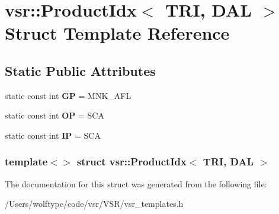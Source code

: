 \hypertarget{structvsr_1_1_product_idx_3_01_t_r_i_00_01_d_a_l_01_4}{\section{vsr\-:\-:Product\-Idx$<$ T\-R\-I, D\-A\-L $>$ Struct Template Reference}
\label{structvsr_1_1_product_idx_3_01_t_r_i_00_01_d_a_l_01_4}
}
\subsection*{Static Public Attributes}
\begin{DoxyCompactItemize}
\item 
\hypertarget{structvsr_1_1_product_idx_3_01_t_r_i_00_01_d_a_l_01_4_a21e13dab2133986b6debaa185715ffb8}{static const int {\bfseries G\-P} = M\-N\-K\-\_\-\-A\-F\-L}\label{structvsr_1_1_product_idx_3_01_t_r_i_00_01_d_a_l_01_4_a21e13dab2133986b6debaa185715ffb8}

\item 
\hypertarget{structvsr_1_1_product_idx_3_01_t_r_i_00_01_d_a_l_01_4_a2c413ceaba5c076a93ec4c3c874f64e0}{static const int {\bfseries O\-P} = S\-C\-A}\label{structvsr_1_1_product_idx_3_01_t_r_i_00_01_d_a_l_01_4_a2c413ceaba5c076a93ec4c3c874f64e0}

\item 
\hypertarget{structvsr_1_1_product_idx_3_01_t_r_i_00_01_d_a_l_01_4_af7522b476ae9495da0a429c1e62de389}{static const int {\bfseries I\-P} = S\-C\-A}\label{structvsr_1_1_product_idx_3_01_t_r_i_00_01_d_a_l_01_4_af7522b476ae9495da0a429c1e62de389}

\end{DoxyCompactItemize}
\subsubsection*{template$<$$>$ struct vsr\-::\-Product\-Idx$<$ T\-R\-I, D\-A\-L $>$}



The documentation for this struct was generated from the following file\-:\begin{DoxyCompactItemize}
\item 
/\-Users/wolftype/code/vsr/\-V\-S\-R/vsr\-\_\-templates.\-h\end{DoxyCompactItemize}
